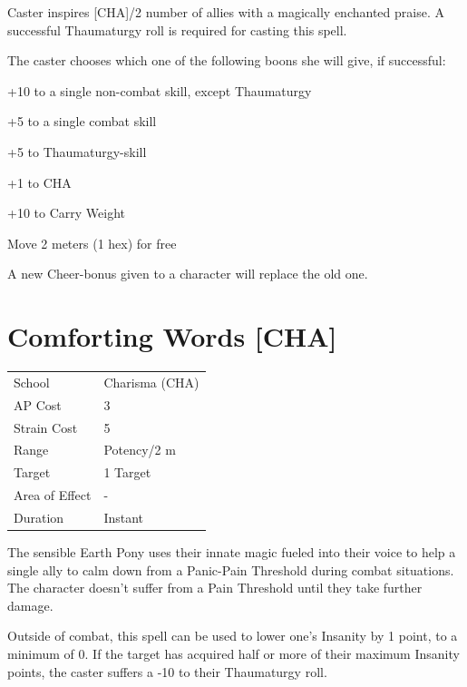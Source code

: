 \documentclass[11pt,a4paper,twocolumn]{book}
\begin{document}
\medskip

Caster inspires [CHA]/2 number of allies with a magically enchanted praise. A successful Thaumaturgy roll is required for casting this spell.

The caster chooses which one of the following boons she will give, if successful:

\medskip
\begin{compactitem}
  \item +10 to a single non-combat skill, except Thaumaturgy
  \item +5 to a single combat skill
  \item +5 to Thaumaturgy-skill
  \item +1 to CHA
  \item +10 to Carry Weight
  \item Move 2 meters (1 hex) for free
\end{compactitem}

\medskip
A new Cheer-bonus given to a character will replace the old one.

\vfill


\section*{Comforting Words [CHA]}
{
	\begin{tabu} to 75mm{| X[l,4] | X[l,7] |}
		\hline
		School 			& Charisma (CHA) 	\\
        AP Cost	      	& 3 				\\
        Strain Cost     & 5 				\\
        Range     		& Potency/2 m 		\\
        Target      	& 1 Target 			\\
        Area of Effect  & - 	 			\\
        Duration     	& Instant		 	\\ \hline
	\end{tabu}
		
}

\medskip

The sensible Earth Pony uses their innate magic fueled into their voice to help a single ally to calm down from a Panic-Pain Threshold during combat situations. The character doesn't suffer from a Pain Threshold until they take further damage.

Outside of combat, this spell can be used to lower one's Insanity by 1 point, to a minimum of 0. If the target has acquired half or more of their maximum Insanity points, the caster suffers a -10 to their Thaumaturgy roll.
\end{document}
